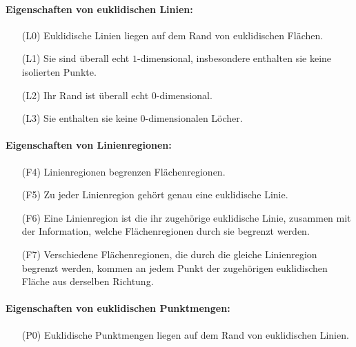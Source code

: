         \paragraph{Eigenschaften von euklidischen Linien:} 
        \begin{itemize}%
            \item[(L0)] Euklidische Linien liegen auf dem Rand von euklidischen Flächen.
            \item[(L1)] Sie sind überall echt $1$-dimensional, insbesondere enthalten sie keine isolierten Punkte.
            \item[(L2)] Ihr Rand ist überall echt $0$-dimensional.
            \item[(L3)] Sie enthalten sie keine $0$-dimensionalen Löcher.
        \end{itemize}
            
        \paragraph{Eigenschaften von Linienregionen:}
        \begin{itemize}
            \item[(F4)] Linienregionen begrenzen Flächenregionen.
            \item[(F5)] Zu jeder Linienregion gehört genau eine euklidische Linie.
            \item[(F6)] Eine Linienregion ist die ihr zugehörige euklidische Linie, zusammen mit der Information, welche Flächenregionen durch sie begrenzt werden.
            \item[(F7)] Verschiedene Flächenregionen, die durch die gleiche Linienregion begrenzt werden, kommen an jedem Punkt der zugehörigen euklidischen Fläche aus derselben Richtung.
        \end{itemize}
            
        \paragraph{Eigenschaften von euklidischen Punktmengen:} 
        \begin{itemize}%
            \item[(P0)] Euklidische Punktmengen liegen auf dem Rand von euklidischen Linien.
        \end{itemize}
        
